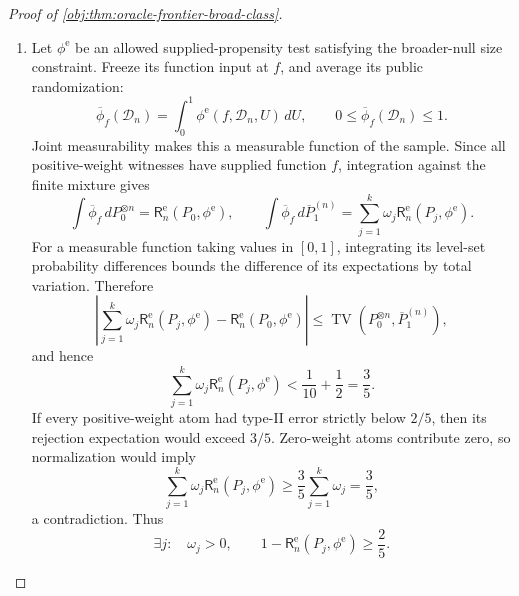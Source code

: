 \begin{proof}[Proof of \cref{obj:thm:oracle-frontier-broad-class}]
\begin{enumerate}
Admissibility gives \(q>0\), \(\gamma>0\), and hence \(E_0>0\). Consequently,
\[
0<r_{\mathrm{low}}
\le d(P_j)<d_0\le D_v^{\mathrm{e,br}}
\qquad(\omega_j>0).
\]
In particular, \(r_{\mathrm{low}}\) is a legal separation with a nonempty alternative class.

\item Let \(\phi^{\mathrm e}\) be an allowed supplied-propensity test satisfying the broader-null size constraint. Freeze its function input at \(f\), and average its public randomization:
\[
\overline\phi_f(\mathcal D_n)
=\int_0^1\phi^{\mathrm e}(f,\mathcal D_n,U)\,dU,
\qquad
0\le\overline\phi_f(\mathcal D_n)\le1.
\]
Joint measurability makes this a measurable function of the sample. Since all positive-weight witnesses have supplied function \(f\), integration against the finite mixture gives
\[
\int\overline\phi_f\,dP_0^{\otimes n}
=\mathsf R_n^{\mathrm e}(P_0,\phi^{\mathrm e}),
\qquad
\int\overline\phi_f\,d\overline P_1^{(n)}
=\sum_{j=1}^k\omega_j\mathsf R_n^{\mathrm e}(P_j,\phi^{\mathrm e}).
\]
For a measurable function taking values in \([0,1]\), integrating its level-set probability differences bounds the difference of its expectations by total variation. Therefore
\[
\left|
\sum_{j=1}^k\omega_j\mathsf R_n^{\mathrm e}(P_j,\phi^{\mathrm e})
-\mathsf R_n^{\mathrm e}(P_0,\phi^{\mathrm e})
\right|
\le
\operatorname{TV}\!\left(P_0^{\otimes n},\overline P_1^{(n)}\right),
\]
and hence
\[
\sum_{j=1}^k\omega_j\mathsf R_n^{\mathrm e}(P_j,\phi^{\mathrm e})
<\frac1{10}+\frac12=\frac35.
\]
If every positive-weight atom had type-II error strictly below \(2/5\), then its rejection expectation would exceed \(3/5\). Zero-weight atoms contribute zero, so normalization would imply
\[
\sum_{j=1}^k\omega_j\mathsf R_n^{\mathrm e}(P_j,\phi^{\mathrm e})
\ge\frac35\sum_{j=1}^k\omega_j
=\frac35,
\]
a contradiction. Thus
\[
\exists j:\quad
\omega_j>0,\qquad
1-\mathsf R_n^{\mathrm e}(P_j,\phi^{\mathrm e})\ge\frac25.
\]


\end{enumerate}
\end{proof}
